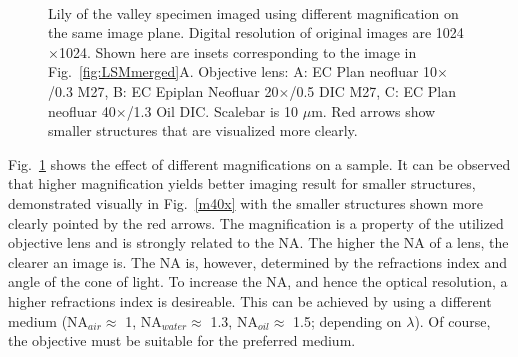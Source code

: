 \begin{figure}[h!]
\centering
{}\hspace{0.1em}
\hspace{0.1em}
\\
\caption{Lily of the valley specimen imaged using different magnification on the same image plane. 
Digital resolution of original images are 1024$\times$1024. 
Shown here are insets corresponding to the image in Fig.~\ref{fig:LSMmerged}A. Objective lens: A: EC Plan neofluar 10$\times$/0.3 M27, B: EC Epiplan Neofluar 20$\times$/0.5 DIC M27, C: EC Plan neofluar 40$\times$/1.3 Oil DIC. 
Scalebar is 10 $\mu$m. Red arrows show smaller structures that are visualized more clearly.}
\label{fig:LSMmag}
\end{figure}

Fig.~\ref{fig:LSMmag} shows the effect of different magnifications on a sample. 
It can be observed that higher magnification yields better imaging result for smaller structures, demonstrated visually in Fig.~\ref{m40x} with the smaller structures shown more clearly pointed by the red arrows. 
The magnification is a property of the utilized objective lens and is strongly related to the NA. 
The higher the NA of a lens, the clearer an image is. 
The NA is, however, determined by the refractions index and angle of the cone of light. 
To increase the NA, and hence the optical resolution, a higher refractions index is desireable. 
This can be achieved by using a different medium (NA$_{air} \approx$ 1, NA$_{water} \approx$ 1.3, NA$_{oil} \approx$ 1.5; depending on $\lambda$). 
Of course, the objective must be suitable for the preferred medium.

